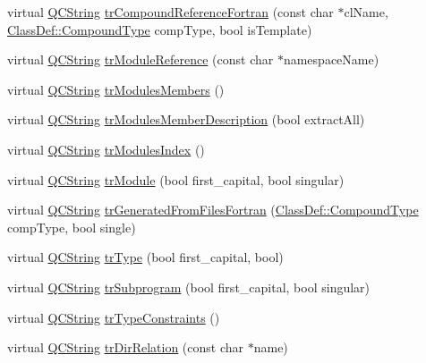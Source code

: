 \begin{DoxyCompactItemize}
\item 
virtual \mbox{\hyperlink{class_q_c_string}{Q\+C\+String}} \mbox{\hyperlink{class_translator_catalan_aa059471d2223dd0e4b573b12ef6c2632}{tr\+Compound\+Reference\+Fortran}} (const char $\ast$cl\+Name, \mbox{\hyperlink{class_class_def_ae70cf86d35fe954a94c566fbcfc87939}{Class\+Def\+::\+Compound\+Type}} comp\+Type, bool is\+Template)
\item 
virtual \mbox{\hyperlink{class_q_c_string}{Q\+C\+String}} \mbox{\hyperlink{class_translator_catalan_ac4aedb1dc1b6d91533d719e4a5e3381c}{tr\+Module\+Reference}} (const char $\ast$namespace\+Name)
\item 
virtual \mbox{\hyperlink{class_q_c_string}{Q\+C\+String}} \mbox{\hyperlink{class_translator_catalan_abf1a10749bae3892aa7ce52038a3a3e4}{tr\+Modules\+Members}} ()
\item 
virtual \mbox{\hyperlink{class_q_c_string}{Q\+C\+String}} \mbox{\hyperlink{class_translator_catalan_a19b3cfcc327ef2357a72f0abf8226c4d}{tr\+Modules\+Member\+Description}} (bool extract\+All)
\item 
virtual \mbox{\hyperlink{class_q_c_string}{Q\+C\+String}} \mbox{\hyperlink{class_translator_catalan_a4540a8e9edb985cec7da2f40fd50af83}{tr\+Modules\+Index}} ()
\item 
virtual \mbox{\hyperlink{class_q_c_string}{Q\+C\+String}} \mbox{\hyperlink{class_translator_catalan_aa7917b53eb558afead346792fcd3f071}{tr\+Module}} (bool first\+\_\+capital, bool singular)
\item 
virtual \mbox{\hyperlink{class_q_c_string}{Q\+C\+String}} \mbox{\hyperlink{class_translator_catalan_a02f372d3c14b138b96a6db845cd1d3d0}{tr\+Generated\+From\+Files\+Fortran}} (\mbox{\hyperlink{class_class_def_ae70cf86d35fe954a94c566fbcfc87939}{Class\+Def\+::\+Compound\+Type}} comp\+Type, bool single)
\item 
virtual \mbox{\hyperlink{class_q_c_string}{Q\+C\+String}} \mbox{\hyperlink{class_translator_catalan_a93e4888110b95d9f1a3f0fee4f2937c0}{tr\+Type}} (bool first\+\_\+capital, bool)
\item 
virtual \mbox{\hyperlink{class_q_c_string}{Q\+C\+String}} \mbox{\hyperlink{class_translator_catalan_a328ad6fb8c14c14f8501ce06b092d22d}{tr\+Subprogram}} (bool first\+\_\+capital, bool singular)
\item 
virtual \mbox{\hyperlink{class_q_c_string}{Q\+C\+String}} \mbox{\hyperlink{class_translator_catalan_a6078622afd8bd3ed53d20254b849a311}{tr\+Type\+Constraints}} ()
\item 
virtual \mbox{\hyperlink{class_q_c_string}{Q\+C\+String}} \mbox{\hyperlink{class_translator_catalan_a4816d9fd00b451a7f8b12dbca18968b8}{tr\+Dir\+Relation}} (const char $\ast$name)

\end{DoxyCompactItemize}
